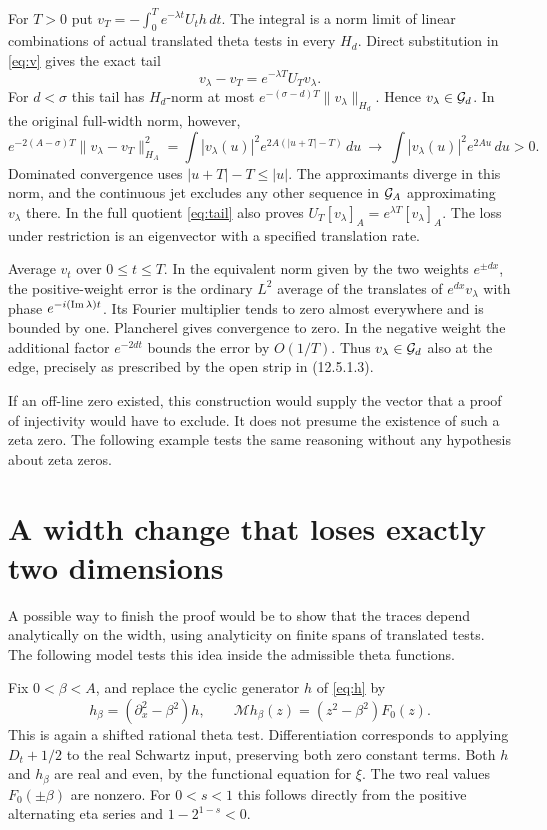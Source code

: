 \documentclass[11pt,letterpaper]{article}
\newcommand{\dd}{\,d}\newcommand{\id}{\mathrm{Id}}
\newcommand{\step}[1]{\par\smallskip{\color{ink}\bfseries #1}\enspace}
\newcommand{\partpage}[2]{\clearpage\section{#1}\label{#2}}
\begin{document}
\step{The same approximation in the two norms.}
For \(T>0\) put \(v_T=-\int_0^T e^{-\lambda t}U_t h\,dt\). The integral is a norm limit of linear combinations of actual translated theta tests in every \(H_d\). Direct substitution in \eqref{eq:v} gives the exact tail
\begin{equation}
          v_\lambda-v_T=e^{-\lambda T}U_T v_\lambda .
          \label{eq:tail}
\end{equation}
For \(d<\sigma\) this tail has \(H_d\)-norm at most \(e^{-(\sigma-d)T}\|v_\lambda\|_{H_d}\). Hence \(v_\lambda\in\mathcal G_d\). In the original full-width norm, however,
\[
 e^{-2(A-\sigma)T}\|v_\lambda-v_T\|_{H_A}^2
 =\int |v_\lambda(u)|^2 e^{2A(|u+T|-T)}\dd u
 \ \longrightarrow\ \int |v_\lambda(u)|^2 e^{2Au}\dd u>0 .
\]
Dominated convergence uses \(|u+T|-T\le|u|\). The approximants diverge in this norm, and the continuous jet excludes any other sequence in \(\mathcal G_A\) approximating \(v_\lambda\) there. In the full quotient \eqref{eq:tail} also proves
\(U_T[v_\lambda]_A=e^{\lambda T}[v_\lambda]_A\). The loss under restriction is an eigenvector with a specified translation rate.

\step{At \(d=\sigma\).}
Average \(v_t\) over \(0\le t\le T\). In the equivalent norm given by the two weights \(e^{\pm dx}\), the positive-weight error is the ordinary \(L^2\) average of the translates of \(e^{dx}v_\lambda\) with phase \(e^{-i(\operatorname{Im}\lambda)t}\). Its Fourier multiplier tends to zero almost everywhere and is bounded by one. Plancherel gives convergence to zero. In the negative weight the additional factor \(e^{-2dt}\) bounds the error by \(O(1/T)\). Thus \(v_\lambda\in\mathcal G_d\) also at the edge, precisely as prescribed by the open strip in (12.5.1.3).

If an off-line zero existed, this construction would supply the vector that a proof of injectivity would have to exclude. It does not presume the existence of such a zeta zero. The following example tests the same reasoning without any hypothesis about zeta zeros.

\partpage{A width change that loses exactly two dimensions}{sec:example}
A possible way to finish the proof would be to show that the traces depend analytically on the width, using analyticity on finite spans of translated tests. The following model tests this idea inside the admissible theta functions.

Fix \(0<\beta<A\), and replace the cyclic generator \(h\) of \eqref{eq:h} by
\[
 h_\beta=(\partial_x^2-\beta^2)h,\qquad
 \mathcal Mh_\beta(z)=(z^2-\beta^2)F_0(z).
\]
This is again a shifted rational theta test. Differentiation corresponds to applying \(D_t+1/2\) to the real Schwartz input, preserving both zero constant terms. Both \(h\) and \(h_\beta\) are real and even, by the functional equation for \(\xi\). The two real values \(F_0(\pm\beta)\) are nonzero. For \(0<s<1\) this follows directly from the positive alternating eta series and \(1-2^{1-s}<0\).
\end{document}
